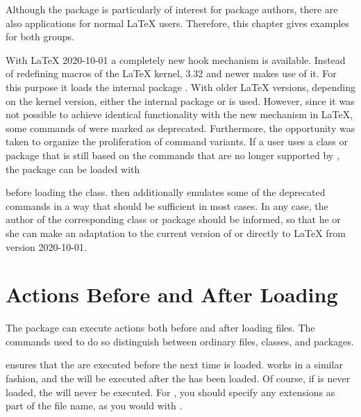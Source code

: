 Although the package is particularly of interest for package authors, there
are also applications for normal \LaTeX{} users.  Therefore, this chapter
gives examples for both groups.

\begin{Declaration}
\end{Declaration}
With \LaTeX{} 2020-10-01 a completely new
hook mechanism is available. Instead of redefining macros of the \LaTeX{}
kernel,  3.32 and newer makes use of it. For this purpose it
loads the internal package
. With older
\LaTeX{} versions, depending on the
kernel version, either the internal package
 or
%
 is used. However, since it
was not possible to achieve identical functionality with the new mechanism in
\LaTeX, some commands of  were marked as
deprecated. Furthermore, the opportunity was taken to organize the
proliferation of command variants. If a user uses a class or package that is
still based on the commands that are no longer supported by
, the package  can be loaded with
\begin{lstcode}
  \RequirePackage[withdeprecated]{scrlfile}
\end{lstcode}
before loading the class.  then additionally emulates some
of the deprecated commands in a way that should be sufficient in most
cases. In any case, the author of the corresponding class or package should be
informed, so that he or she can make an adaptation to the current version of
 or directly to \LaTeX{} from version 2020-10-01.%
%
\EndIndexGroup

\section{Actions Before and After Loading}

The  package can execute actions both before and after
loading files. The commands used to do so distinguish between ordinary files,
classes, and packages.

\begin{Declaration}
\end{Declaration}%
 ensures that the  are executed before the
next time  is loaded.  works in a similar
fashion, and the  will be executed after the  has
been loaded. Of course, if  is never loaded, the 
will never be executed. For , you should specify any extensions as
part of the file name, as you would with .

